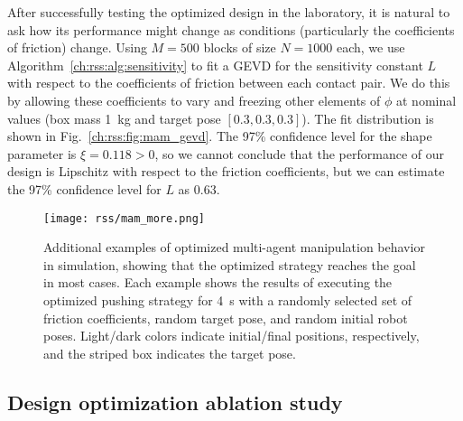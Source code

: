 After successfully testing the optimized design in the laboratory, it is natural to ask how its performance might change as conditions (particularly the coefficients of friction) change. Using $M = 500$ blocks of size $N=1000$ each, we use Algorithm~\ref{ch:rss:alg:sensitivity} to fit a GEVD for the sensitivity constant $L$ with respect to the coefficients of friction between each contact pair. We do this by allowing these coefficients to vary and freezing other elements of $\phi$ at nominal values (box mass \SI{1}{kg} and target pose $[0.3, 0.3, 0.3]$). The fit distribution is shown in Fig.~\ref{ch:rss:fig:mam_gevd}. The 97\% confidence level for the shape parameter is $\xi = 0.118 > 0$, so we cannot conclude that the performance of our design is Lipschitz with respect to the friction coefficients, but we can estimate the 97\% confidence level for $L$ as $0.63$.


\begin{figure}[t]
    \centering
    \texttt{[image: rss/mam\_more.png]}
    \caption{Additional examples of optimized multi-agent manipulation behavior in simulation, showing that the optimized strategy reaches the goal in most cases. Each example shows the results of executing the optimized pushing strategy for \SI{4}{s} with a randomly selected set of friction coefficients, random target pose, and random initial robot poses. Light/dark colors indicate initial/final positions, respectively, and the striped box indicates the target pose.}
    \label{ch:rss:fig:mam_more}
\end{figure}


\subsection{Design optimization ablation study}\label{ch:rss:ablation}

